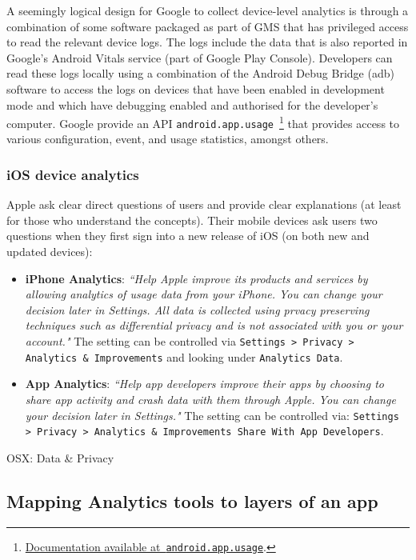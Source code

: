 A seemingly logical design for Google to collect device-level analytics is through a combination of some software packaged as part of GMS that has privileged access to read the relevant device logs. The logs include the data that is also reported in Google's Android Vitals service (part of Google Play Console). Developers can read these logs locally using a combination of the Android Debug Bridge (adb) software to access the logs on devices that have been enabled in development mode and which have debugging enabled and authorised for the developer's computer. Google provide an API \texttt{android.app.usage}~\footnote{\href{https://developer.android.com/reference/android/app/usage/package-summary.html}{Documentation available at~\texttt{android.app.usage}}.} that provides access to various configuration, event, and usage statistics, amongst others.

\subsubsection{iOS device analytics}
Apple ask clear direct questions of users and provide clear explanations (at least for those who understand the concepts). Their mobile devices ask users two questions when they first sign into a new release of iOS (on both new and updated devices):
\begin{itemize}
    \item \textbf{iPhone Analytics}: \emph{``Help Apple improve its products and services by allowing analytics of usage data from your iPhone. You can change your decision later in Settings. All data is collected using prvacy preserving techniques such as differential privacy and is not associated with you or your account."} The setting can be controlled via \texttt{Settings > Privacy > Analytics \& Improvements} and looking under \texttt{Analytics Data}.
    \item \textbf{App Analytics}: \emph{``Help app developers improve their apps by choosing to share app activity and crash data with them through Apple. You can change your decision later in Settings."} The setting can be controlled via: \texttt{Settings > Privacy > Analytics \& Improvements Share With App Developers}.
\end{itemize}

OSX: Data \& Privacy

\subsection{Mapping Analytics tools to layers of an app}

